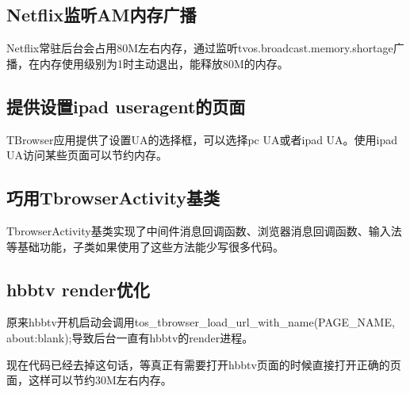 \subsection{Netflix监听AM内存广播}
Netflix常驻后台会占用80M左右内存，通过监听tvos.broadcast.memory.shortage广播，在内存使用级别为1时主动退出，能释放80M的内存。
\subsection{提供设置ipad useragent的页面}
TBrowser应用提供了设置UA的选择框，可以选择pc UA或者ipad UA。使用ipad UA访问某些页面可以节约内存。
\subsection{巧用TbrowserActivity基类}
TbrowserActivity基类实现了中间件消息回调函数、浏览器消息回调函数、输入法等基础功能，子类如果使用了这些方法能少写很多代码。
\subsection{hbbtv render优化}
原来hbbtv开机启动会调用tos\_tbrowser\_load\_url\_with\_name(PAGE\_NAME, about:blank);导致后台一直有hbbtv的render进程。\par
现在代码已经去掉这句话，等真正有需要打开hbbtv页面的时候直接打开正确的页面，这样可以节约30M左右内存。

\ifx\withtbrowser\undefined
\else

\fi
